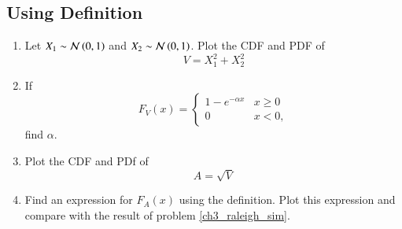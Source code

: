 \renewcommand{\theequation}{\theenumi}
\renewcommand{\thefigure}{\theenumi}

\subsection{Using Definition}
\begin{enumerate}[label=\thesubsection.\arabic*.,ref=\thesubsection.\theenumi]

%
\item
Let $X_1 \sim  \mathcal{N}\left(0,1\right)$ and $X_2 \sim  \mathcal{N}\left(0,1\right)$. Plot the CDF and PDF of
%
\begin{equation}
V = X_1^2 + X_2^2 
\end{equation}
%
%

\item
If
%
\begin{equation}
F_{V}(x) = 
\begin{cases}
1 - e^{-\alpha x} & x \geq 0 \\
0 & x < 0,
\end{cases}
\label{eq:probman_F_V_alpha}
\end{equation}
%
find $\alpha$.

%
\item
\label{ch3_raleigh_sim}
Plot the CDF and PDf of
%
\begin{equation}
A = \sqrt{V}
\end{equation}
%

%
\item
Find an expression for $F_{A}(x)$ using the definition. Plot this expression and compare with the result of problem \ref{ch3_raleigh_sim}. 
\\
\solution 


\end{enumerate}
